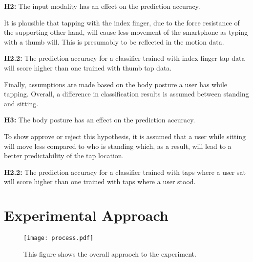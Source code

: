 \begin{center}
  \begin{mdframed}[backgroundcolor=gray!10]
    \textbf{H2:} The input modality has an effect on the prediction accuracy.
  \end{mdframed}
\end{center}

It is plausible that tapping with the index finger, due to the force resistance of the supporting other hand, will cause less movement of the smartphone as typing with a thumb will. This is presumably to be reflected in the motion data.

\begin{center}
  \begin{framed}
    \textbf{H2.2:} The prediction accuracy for a classifier trained with index finger tap data will score higher than one trained with thumb tap data.
  \end{framed}
\end{center}

Finally, assumptions are made based on the body posture a user has while tapping. Overall, a difference in classification results is assumed between standing and sitting.
\begin{center}
  \begin{framed}
    \textbf{H3:} The body posture has an effect on the prediction accuracy.
  \end{framed}
\end{center}

To show approve or reject this hypothesis, it is assumed that a user while sitting will move less compared to who is standing which, as a result, will lead to a better predictability of the tap location.

\begin{center}
  \begin{framed}
    \textbf{H2.2:} The prediction accuracy for a classifier trained with taps where a user sat will score higher than one trained with taps where a user stood.
  \end{framed}
\end{center}

\section{Experimental Approach}

\begin{figure}[h!]
  \centering
  \texttt{[image: process.pdf]}
  \caption{This figure shows the overall appraoch to the experiment.} \label{fig:appraoch}
\end{figure}

